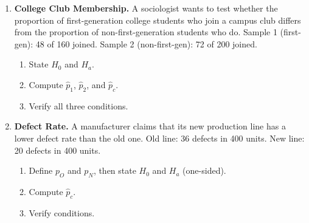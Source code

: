 \documentclass[10pt]{article}
\begin{document}
\namedateperiod

\vspace{0.15in}

\begin{enumerate}

\item \textbf{College Club Membership.} A sociologist wants to test whether the proportion
of first-generation college students who join a campus club differs from the proportion of
non-first-generation students who do. Sample 1 (first-gen): 48 of 160 joined.
Sample 2 (non-first-gen): 72 of 200 joined.

\begin{enumerate}[label=\alph*.]
  \item State $H_0$ and $H_a$. 
  \item Compute $\hat p_1$, $\hat p_2$, and $\hat p_c$. 
  \item Verify all three conditions. 
\end{enumerate}

\item \textbf{Defect Rate.} A manufacturer claims that its new production line has a lower
defect rate than the old one. Old line: 36 defects in 400 units. New line: 20 defects in 400 units.

\begin{enumerate}[label=\alph*.]
  \item Define $p_O$ and $p_N$, then state $H_0$ and $H_a$ (one-sided). 
  \item Compute $\hat p_c$. 
  \item Verify conditions. 
\end{enumerate}

\end{enumerate}
\end{document}
